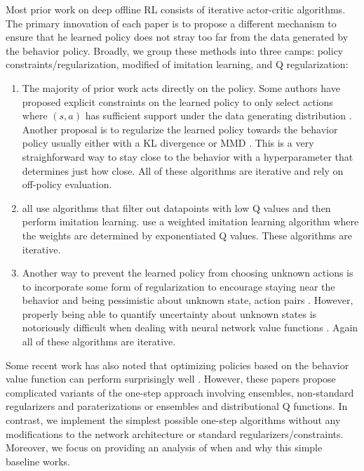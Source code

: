Most prior work on deep offline RL consists of iterative actor-critic algorithms. The primary innovation of each paper is to propose a different mechanism to ensure that he learned policy does not stray too far from the data generated by the behavior policy. Broadly, we group these methods into three camps: policy constraints/regularization, modified of imitation learning, and Q regularization:

\begin{enumerate}[leftmargin=*]
\item The majority of prior work acts directly on the policy.
Some authors have proposed explicit constraints on the learned policy to only select actions where $ (s,a)$ has sufficient support under the data generating distribution \citep{fujimoto2018off, fujimoto2019benchmarking, laroche2019safe}.
Another proposal is to regularize the learned policy towards the behavior policy \citep{wu2019behavior} usually either with a KL divergence \citep{jaques2019way} or MMD \citep{kumar2019stabilizing}. This is a very straighforward way to stay close to the behavior with a hyperparameter that determines just how close. All of these algorithms are iterative and rely on off-policy evaluation.

\item \citep{Siegel2020Keep, wang2020critic, chen2020bail} all use algorithms that filter out datapoints with low Q values and then perform imitation learning.
\citep{wang2018exponentially, peng2019advantage} use a weighted imitation learning algorithm where the weights are determined by exponentiated Q values.
These algorithms are iterative.
\item Another way to prevent the learned policy from choosing unknown actions is to incorporate some form of regularization to encourage staying near the behavior and being pessimistic about unknown state, action pairs \citep{wu2019behavior, nachum2019algaedice, kumar2020conservative, kostrikov2021offline}.
However, properly being able to quantify uncertainty about unknown states is notoriously difficult when dealing with neural network value functions \citep{buckman2020importance}.
Again all of these algorithms are iterative.
\end{enumerate}


Some recent work has also noted that optimizing policies based on the behavior value function can perform surprisingly well \citep{gulcehre2020rl, goo2020you}. However, these papers propose complicated variants of the one-step approach involving ensembles, non-standard regularizers and paraterizations or ensembles and distributional Q functions. In contrast, we implement the simplest possible one-step algorithms without any modifications to the network architecture or standard regularizers/constraints.
Moreover, we focus on providing an analysis of when and why this simple baseline works.

